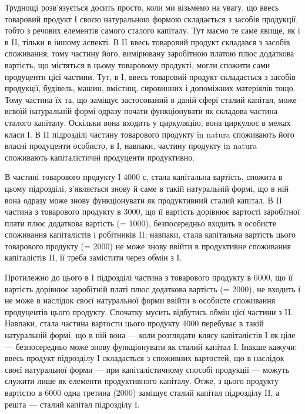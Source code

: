 

Труднощі розв’язується досить просто, коли ми візьмемо на увагу,
що ввесь товаровий продукт І своєю натуральною формою складається
з засобів продукції, тобто з речових елементів самого сталого капіталу.
Тут маємо те саме явище, як і в II, тільки в іншому аспекті. В II ввесь товаровий
продукт складався з засобів споживання; тому частину його, вимірювану
заробітною платою плюс додаткова вартість, що містяться в цьому товаровому
продукті, могли спожити сами продуценти цієї частини. Тут, в
І, ввесь товаровий продукт складається з засобів продукції, будівель, машин,
вмістищ, сировинних і допоміжних матеріялів тощо. Тому частина їх
та, що заміщує застосований в даній сфері сталий капітал, може всвоїй натуральній
формі одразу почати функціонувати як складова частина сталого
капіталу. Оскільки вона входить у циркуляцію, вона циркулює в межах
класи І. В II підрозділі частину товарового продукту in natura споживають
його власні продуценти особисто, в І, навпаки, частину продукту
in natura споживають капіталістичні продуценти продуктивно.

В частині товарового продукту І \deq{} 4000 с, стала капітальна вартість,
спожита в цьому підрозділі, з’являється знову й саме в такій натуральній
формі, що в ній вона одразу може знову функціонувати як продуктивний
сталий капітал. В II частина з товарового продукту в 3000, що її вартість
дорівнює вартості заробітної плати плюс додаткова вартість (= 1000),
безпосередньо входить в особисте споживання капіталістів і робітників II;
навпаки, стала капітальна вартість цього товарового продукту (= 2000)
не може знову ввійти в продуктивне споживання капіталістів II, її треба
замістити через обмін з І.

Протилежно до цього в І підрозділі частина з товарового продукту
в 6000, що її вартість дорівнює заробітній платі плюс додаткова вартість
(= 2000), не входить і не може в наслідок своєї натуральної форми
ввійти в особисте споживання продуцентів цього продукту. Спочатку
мусить відбутись обмін цієї частини з II. Навпаки, стала частина вартости
цього продукту \deq{} 4000 перебуває в такій натуральній формі, що в ній
вона — коли розглядати клясу капіталістів І як ціле — безпосередньо може
знову функціонувати як сталий капітал І. Інакше кажучи: ввесь продукт
підрозділу І складається з споживних вартостей, що в наслідок своєї натуральної
форми — при капіталістичному способі продукції — можуть служити
лише як елементи продуктивного капіталу. Отже, з цього продукту
вартістю в 6000 одна третина (2000) заміщує сталий капітал підрозділу II,
а решта  — сталий капітал підрозділу І.

